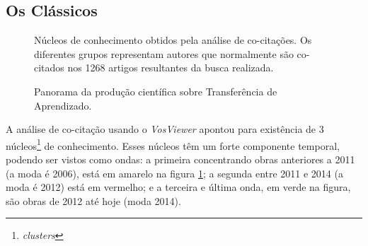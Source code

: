 \documentclass[sigconf]{acmart}
\newcommand{\source}[2]{\raggedleft{}\vspace*{-7mm}\caption*{ \textmd{\scriptsize{Dados: {#1}.\hfill Ferramenta:{#2}}}}}
\begin{document}
  \subsection{Os Clássicos}\label{classicos}
  \begin{figure}[h!]
    \source{Web of Science (março/2019)}{VosViewer\protect{~\cite{VOSviewer}}}
    \caption{Núcleos de conhecimento obtidos pela análise de co-citações. Os diferentes grupos representam autores que normalmente são co-citados nos 1268 artigos resultantes da busca realizada.}
    \label{fig:classicos}
  \end{figure}
  \begin{figure}[htp]
    \centering
    \source{Web of Science (março/2019)}{Excel}
    \caption{Panorama da produção científica sobre Transferência de Aprendizado.} \label{fig:toptop}
  \end{figure}
A análise de co-citação usando o \emph{VosViewer} apontou para existência de 3 núcleos\footnote{\emph{clusters}} de conhecimento. Esses núcleos têm um forte componente temporal, podendo ser vistos como ondas: a primeira concentrando obras anteriores a 2011 (a moda é 2006),  está em amarelo na figura \ref{fig:classicos}; a segunda entre 2011 e 2014 (a moda é 2012) está em vermelho; e a terceira e última onda, em verde na figura, são obras de 2012 até hoje (moda 2014).
\end{document}
